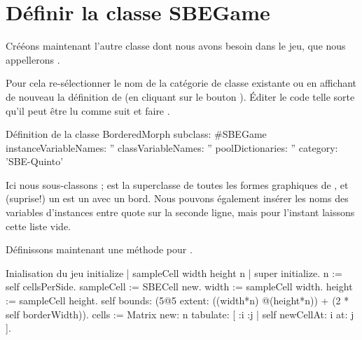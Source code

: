 \documentclass[a4paper,10pt,twoside]{book}
\begin{document}

\section{Définir la classe SBEGame}

Crééons maintenant l'autre classe dont nous avons besoin dans le jeu, que nous appellerons .

Pour cela re-sélectionner le nom de la catégorie de classe existante ou en affichant de nouveau la définition de  (en cliquant sur le bouton ).
Éditer le code telle sorte qu'il peut être lu comme suit et faire .

\begin{classdef}[sbegame]{Définition de la classe }
BorderedMorph subclass: #SBEGame
   instanceVariableNames: ''
   classVariableNames: ''
   poolDictionaries: ''
   category: 'SBE-Quinto'
\end{classdef}

Ici nous sous-classons ;  est la superclasse de toutes les formes graphiques de \squeak, et (suprise!) un  est un  avec un bord.  
Nous pouvons également insérer les noms des variables d'instances entre quote sur la seconde ligne, mais pour l'instant laissons cette liste vide.

Définissons maintenant une méthode  pour .


\begin{numMethod}[sbegameinitialize]{Inialisation du jeu}
initialize
   | sampleCell width height n |
   super initialize.
   n := self cellsPerSide.
   sampleCell := SBECell new.
   width := sampleCell width.
   height := sampleCell height.
   self bounds: (5@5 extent: ((width*n) @(height*n)) + (2 * self borderWidth)).
   cells := Matrix new: n tabulate: [ :i :j | self newCellAt: i at: j ].
\end{numMethod}

\end{document}
